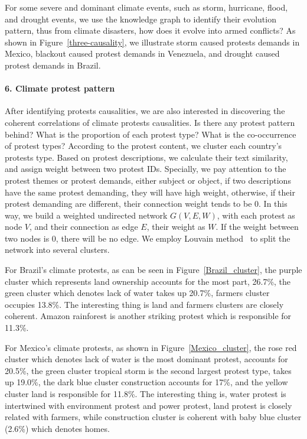 \documentclass[9pt,twocolumn,twoside]{pnas-new}
\begin{document}

For some severe and dominant climate events, such as storm, hurricane, flood, and drought events, we use the knowledge graph to identify their evolution pattern, thus from climate disasters, how does it evolve into armed conflicts? As shown in Figure~\ref{three-causality}, we illustrate storm caused protests demands in Mexico, blackout caused protest demands in Venezuela, and drought caused protest demands in Brazil.


\paragraph{6. Climate protest pattern}
After identifying protests causalities, we are also interested in discovering the coherent correlations of climate protests causalities. Is there any protest pattern behind? What is the proportion of each protest type? What is the co-occurrence of protest types? According to the protest content, we cluster each country's protests type. Based on protest descriptions, we calculate their text similarity, and assign weight between two protest IDs. Specially, we pay attention to the protest themes or protest demands, either subject or object, if two descriptions have the same protest demanding, they will have high weight, otherwise, if their protest demanding are different, their connection weight tends to be 0. In this way, we build a weighted undirected network $G(V, E, W)$, with each protest as node $V$, and their connection as edge $E$, their weight as $W$. If the weight between two nodes is 0, there will be no edge. We employ Louvain method~\cite{blondel2008fast} to split the network into several clusters.


For Brazil's climate protests, as can be seen in Figure~\ref{Brazil_cluster}, the purple cluster which represents land ownership accounts for the most part, 26.7\%, the green cluster which denotes lack of water takes up 20.7\%, farmers cluster occupies 13.8\%. The interesting thing is land and farmers clusters are closely coherent. Amazon rainforest is another striking protest which is responsible for 11.3\%.

For Mexico's climate protests, as shown in Figure~\ref{Mexico_cluster}, the rose red cluster which denotes lack of water is the most dominant protest, accounts for 20.5\%, the green cluster tropical storm is the second largest protest type, takes up 19.0\%, the dark blue cluster construction accounts for 17\%, and the yellow cluster land is responsible for 11.8\%. The interesting thing is, water protest is intertwined with environment protest and power protest, land protest is closely related with farmers, while construction cluster is coherent with baby blue cluster (2.6\%) which denotes homes.
\end{document}
